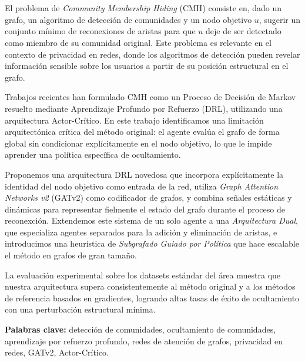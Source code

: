 \chapter*{\runtitulo}

\noindent
El problema de \emph{Community Membership Hiding} (CMH) consiste en, dado un grafo, un
algoritmo de detecci\'on de comunidades y un nodo objetivo $u$, sugerir un conjunto m\'inimo de
reconexiones de aristas para que $u$ deje de ser detectado como miembro de su comunidad
original. Este problema es relevante en el contexto de privacidad en redes, donde los
algoritmos de detecci\'on pueden revelar informaci\'on sensible sobre los usuarios a partir
de su posici\'on estructural en el grafo.

Trabajos recientes han formulado CMH como un Proceso de Decisi\'on de Markov resuelto
mediante Aprendizaje Profundo por Refuerzo (DRL), utilizando una arquitectura Actor-Cr\'itico.
En este trabajo identificamos una limitaci\'on arquitect\'onica cr\'itica del m\'etodo original: el
agente eval\'ua el grafo de forma global sin condicionar expl\'icitamente en el nodo objetivo,
lo que le impide aprender una pol\'itica espec\'ifica de ocultamiento.

Proponemos una arquitectura DRL novedosa que incorpora expl\'icitamente la identidad del
nodo objetivo como entrada de la red, utiliza \emph{Graph Attention Networks v2} (GATv2)
como codificador de grafos, y combina se\~nales est\'aticas y din\'amicas para representar
fielmente el estado del grafo durante el proceso de reconexci\'on. Extendemos este sistema
de un solo agente a una \emph{Arquitectura Dual}, que especializa agentes separados para la
adici\'on y eliminaci\'on de aristas, e introducimos una heur\'istica de \emph{Subgrafado Guiado
por Pol\'itica} que hace escalable el m\'etodo en grafos de gran tama\~no.

La evaluaci\'on experimental sobre los datasets est\'andar del \'area muestra que nuestra
arquitectura supera consistentemente al m\'etodo original y a los m\'etodos de referencia
basados en gradientes, logrando altas tasas de \'exito de ocultamiento con una perturbaci\'on
estructural m\'inima.

\bigskip

\noindent\textbf{Palabras clave:} detecci\'on de comunidades, ocultamiento de comunidades,
aprendizaje por refuerzo profundo, redes de atenci\'on de grafos, privacidad en redes,
GATv2, Actor-Cr\'itico.
